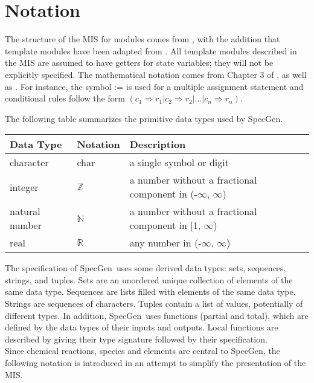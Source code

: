 \documentclass[12pt, titlepage]{article}
\newcommand{\progname}{SpecGen}
\begin{document}
\section{Notation}

The structure of the MIS for modules comes from \citet{HoffmanAndStrooper1995},
with the addition that template modules have been adapted from
\cite{GhezziEtAl2003}.  All template modules described in the MIS are assumed to have
getters for state variables; they will not be explicitly specified.  The mathematical 
notation comes from Chapter 3 of
\citet{HoffmanAndStrooper1995}, as well as \cite{GS1993}.  For instance, 
the symbol := is used for a
multiple assignment statement and conditional rules follow the form $(c_1
\Rightarrow r_1 | c_2 \Rightarrow r_2 | ... | c_n \Rightarrow r_n )$.

The following table summarizes the primitive data types used by \progname. 

\begin{center}
\renewcommand{\arraystretch}{1.2}
\noindent 
\begin{tabular}{l l p{7.5cm}} 
\toprule 
\textbf{Data Type} & \textbf{Notation} & \textbf{Description}\\ 
\midrule
character & char & a single symbol or digit\\
integer & $\mathbb{Z}$ & a number without a fractional component in (-$\infty$, $\infty$) \\
natural number & $\mathbb{N}$ & a number without a fractional component in [1, $\infty$) \\
real & $\mathbb{R}$ & any number in (-$\infty$, $\infty$)\\
\bottomrule
\end{tabular} 
\end{center}

\noindent
The specification of \progname \ uses some derived data types: sets, sequences, strings, and
tuples. Sets are an unordered unique collection of elements of the same data type.  
Sequences are lists filled with elements of the same data type. Strings
are sequences of characters. Tuples contain a list of values, potentially of
different types. In addition, \progname \ uses functions (partial and total), which
are defined by the data types of their inputs and outputs. Local functions are
described by giving their type signature followed by their specification.\\

\noindent
Since chemical reactions, species and elements are central to \progname{}, the following 
notation is introduced in an attempt to simplify the presentation of the MIS.\\
\end{document}
